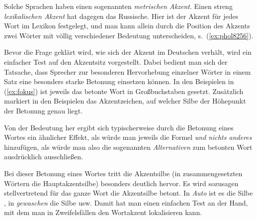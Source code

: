 \begin{exe}
\end{exe}

Solche Sprachen haben einen sogenannten \textit{metrischen Akzent}.
Einen streng \textit{lexikalischen Akzent} hat dagegen das Russische.
Hier ist der Akzent für jedes Wort im Lexikon festgelegt, und man kann allein durch die Position des Akzents zwei Wörter mit völlig verschiedener Bedeutung unterscheiden, s.\ (\ref{ex:phol8256}).

\begin{exe}
\end{exe}

Bevor die Frage geklärt wird, wie sich der Akzent im Deutschen verhält, wird ein einfacher Test auf den Akzentsitz vorgestellt.
Dabei bedient man sich der Tatsache, dass Sprecher zur besonderen Hervorhebung einzelner Wörter in einem Satz eine besonders starke Betonung einsetzen können.
In den Beispielen in (\ref{ex:fokus}) ist jeweils das betonte Wort in Großbuchstaben gesetzt.
Zusätzlich markiert in den Beispielen das Akzentzeichen, auf welcher Silbe der Höhepunkt der Betonung genau liegt.

\begin{exe}
  \ex\label{ex:fokus}
  \begin{xlist}
  \end{xlist}
\end{exe}

Von der Bedeutung her ergibt sich typischerweise durch die Betonung eines Wortes ein ähnlicher Effekt, als würde man jeweils die Formel \textit{und nichts anderes} hinzufügen, als würde man also die sogenannten \textit{Alternativen} zum betonten Wort ausdrücklich ausschließen.

\begin{exe}
  \ex\label{ex:fokus-deutlich}
  \begin{xlist}
  \end{xlist}
\end{exe}

Bei dieser Betonung eines Wortes tritt die Akzentsilbe (in zusammengesetzten Wörtern die Hauptakzentsilbe) besonders deutlich hervor.
Es wird sozusagen stellvertretend für das ganze Wort die Akzentsilbe betont.
In \textit{Auto} ist es die Silbe \textipa{[\t{aO}]}, in \textit{gewaschen} die Silbe \textipa{[va]} usw.
Damit hat man einen einfachen Test an der Hand, mit dem man in Zweifelsfällen den Wortakzent lokalisieren kann.

